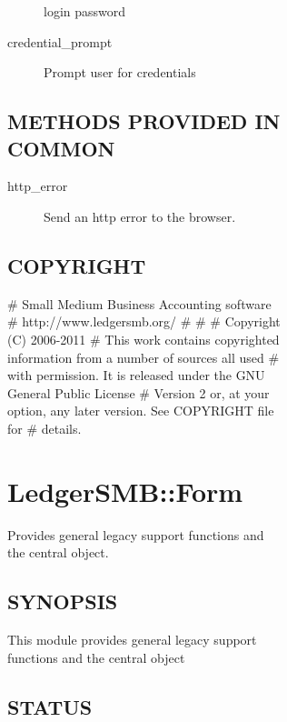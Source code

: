 \begin{description}
\begin{description}
\begin{description}
\begin{description}
\begin{description}
\begin{description}
login
password


\item[{credential\_prompt}] \mbox{}

Prompt user for credentials

\end{description}
\subsection*{METHODS PROVIDED IN COMMON\label{LedgerSMB::Auth_pm_METHODS_PROVIDED_IN_COMMON}}
\begin{description}

\item[{http\_error}] \mbox{}

Send an http error to the browser.

\end{description}
\subsection*{COPYRIGHT\label{LedgerSMB::Auth_pm_COPYRIGHT}}


\# Small Medium Business Accounting software
\# http://www.ledgersmb.org/
\#
\#
\# Copyright (C) 2006-2011
\# This work contains copyrighted information from a number of sources all used
\# with permission.  It is released under the GNU General Public License
\# Version 2 or, at your option, any later version.  See COPYRIGHT file for
\# details.

\section{LedgerSMB::Form\label{LedgerSMB::Form}}


Provides general legacy support functions and the central object.

\subsection*{SYNOPSIS\label{LedgerSMB::Form_SYNOPSIS}}


This module provides general legacy support functions and the central object

\subsection*{STATUS\label{LedgerSMB::Form_STATUS}}



\end{description}
\end{description}
\end{description}
\end{description}
\end{description}
